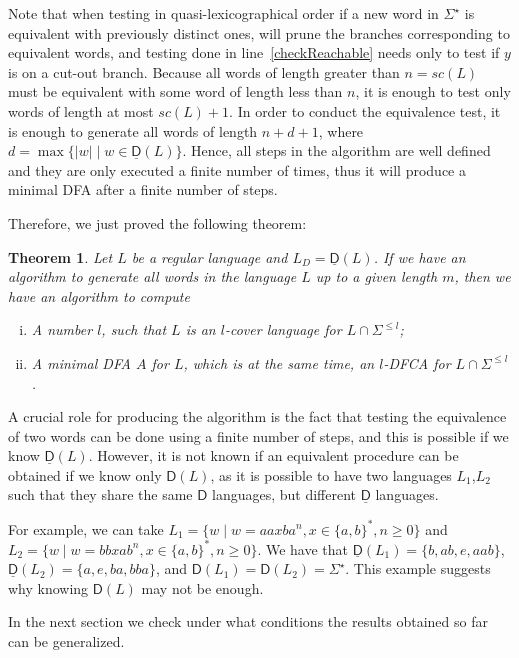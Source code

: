 \documentclass{article}
\newtheorem{theorem}{Theorem}
\newcommand{\dis}[1]{\mathsf{D}(#1)}
\newcommand{\diso}{\mathsf{D}}
\newcommand{\distmin}[1]{\underline{\mathsf{D}}(#1)}
\newcommand{\distmino}{\underline{\mathsf{D}}}
\begin{document}
Note that when testing in quasi-lexicographical order if a new 
word in $\Sigma^{\star}$ is equivalent with previously distinct ones, 
will prune the branches corresponding to  equivalent words,
 and testing done in line~\ref{checkReachable} needs only to test if $y$ 
is on a cut-out branch.
Because all words of length greater than  $n=sc(L)$ must be equivalent
with some word of length less than $n$, it is enough to test only words
of length at most $sc(L)+1$. In order to conduct the equivalence 
test, it is enough to generate  all words of length $n+d+1$, where $d=\max\{|w| \mid w\in \distmin{L}\}$. Hence, all steps in the algorithm are well defined and they are only executed 
a finite number of times, thus it will produce a minimal DFA after a finite number of steps.



Therefore, we just proved the following theorem:
\begin{theorem}
 Let $L$ be a regular language and $L_D=\distmin{L}$. 
If we have an algorithm to generate all words in the language $L$ up to a given length $m$, 
then we have an algorithm to compute
\begin{enumerate}[i)]
  \item A number $l$, such that $L$ is an $l$-cover language for $L\cap\Sigma^{\leq l}$;
  \item A minimal DFA $A$ for $L$, which is at the same time, an $l$-DFCA for $L\cap\Sigma^{\leq l}$.
\end{enumerate}
\end{theorem}


A crucial role for producing the algorithm is the fact that testing the equivalence of two words
can be done using a finite number of steps, and this is possible if we know $\distmin{L}$.
However, it is not known if an equivalent procedure can be obtained if we know only $\dis{L}$, 
as it is possible to have two languages $L_1$,$L_2$
such that they share the same $\diso$ languages, but different  $\distmino$ languages.

For example, we can take $L_1=\{w\mid w=aaxba^n, x\in \{a,b\}^*, n\geq 0\}$
and $L_2=\{w\mid w=bbxab^n, x\in \{a,b\}^*, n\geq 0\}$.
We have that 
$\distmin{L_1} =\{ b, ab, e,aab\}$, $\distmin{L_2} = \{a,e,ba, bba\}$, 
and $\dis{L_1}=\dis{L_2}=\Sigma^\star$.
This example suggests why knowing $\dis{L}$ may not be enough.





In the next section we check under what conditions the results obtained 
so far can be generalized.
\end{document}
